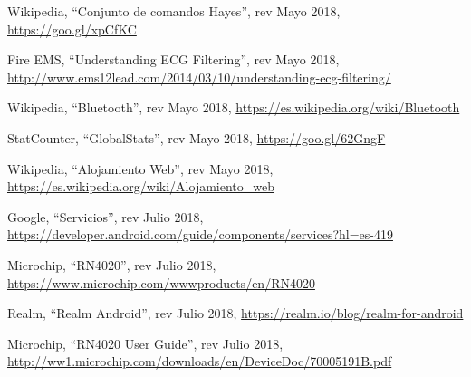 \begin{thebibliography}{99}
 Wikipedia, ``Conjunto de comandos Hayes'', rev Mayo 2018, \hyperref[AT]{https://goo.gl/xpCfKC}

 Fire EMS, ``Understanding ECG Filtering'', rev Mayo 2018, \hyperref[ecg_rate]{http://www.ems12lead.com/2014/03/10/understanding-ecg-filtering/}

 Wikipedia, ``Bluetooth'', rev Mayo 2018, \hyperref[bluetooth]{https://es.wikipedia.org/wiki/Bluetooth}

 StatCounter, ``GlobalStats'', rev Mayo 2018, \hyperref[market_share_cita]{https://goo.gl/62GngF}

 Wikipedia, ``Alojamiento Web'', rev Mayo 2018, \hyperref[hosting_web]{https://es.wikipedia.org/wiki/Alojamiento\_web}

 Google, ``Servicios'', rev Julio 2018, \hyperref[services]{https://developer.android.com/guide/components/services?hl=es-419}

 Microchip, ``RN4020'', rev Julio 2018, \hyperref[RN4020_code]{https://www.microchip.com/wwwproducts/en/RN4020}

 Realm, ``Realm Android'', rev Julio 2018, \hyperref[realm_android]{https://realm.io/blog/realm-for-android}

 Microchip, ``RN4020 User Guide'', rev Julio 2018, \hyperref[user_guide_rn4020]{http://ww1.microchip.com/downloads/en/DeviceDoc/70005191B.pdf}

%
%
\end{thebibliography}